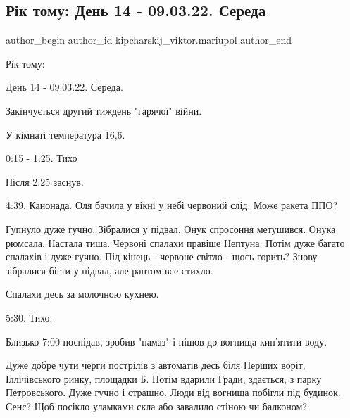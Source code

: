  
 
 
 
 

\subsection{Рік тому:  День 14 - 09.03.22. Середа}
\label{sec:09_03_2023.fb.kipcharskij_viktor.mariupol.1.r_k_tomu___den_14___}

\ifcmt
 author_begin
   author_id kipcharskij_viktor.mariupol
 author_end
\fi

Рік тому: 

День 14 - 09.03.22. Середа. 

Закінчується другий тиждень "гарячої" війни.

У кімнаті температура 16,6. 

0:15 - 1:25. Тихо

Після 2:25 заснув.

4:39. Канонада. Оля бачила у вікні у небі червоний слід. Може ракета ППО? 

Гупнуло дуже гучно. Зібралися у підвал. Онук спросоння метушився. Онука
рюмсала. Настала тиша. Червоні спалахи правіше Нептуна. Потім дуже багато
спалахів і дуже гучно. Під кінець - червоне світло - щось горить? Знову
зібралися бігти у підвал, але раптом все стихло.

Спалахи десь за молочною кухнею.

5:30. Тихо.

Близько 7:00 поснідав, зробив "намаз" і пішов до вогнища кип'ятити воду.

Дуже добре чути черги пострілів з автоматів десь біля Перших воріт,
Іллічівського ринку, площадки Б. Потім вдарили Гради, здається, з парку
Петровського. Дуже гучно і страшно. Люди від вогнища побігли під будинок. Сенс?
Щоб посікло уламками скла або завалило стіною чи балконом?

